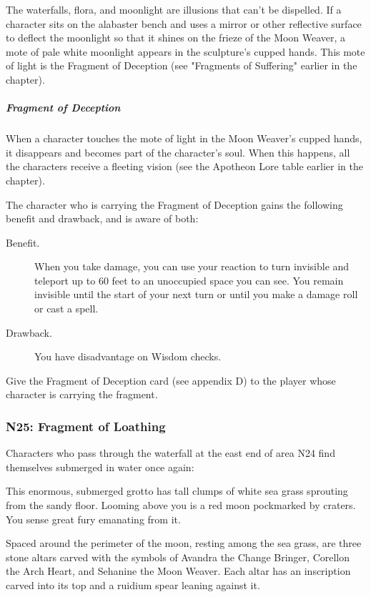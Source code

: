 \documentclass[10pt,a4paper,twoside,fancy,bg=print,twocolumn,openany,nodeprecatedcode]{dndbook}
\begin{document}
The waterfalls, flora, and moonlight are illusions that can't be dispelled. If a character sits on the alabaster bench and uses a mirror or other reflective surface to deflect the moonlight so that it shines on the frieze of the Moon Weaver, a mote of pale white moonlight appears in the sculpture's cupped hands. This mote of light is the Fragment of Deception (see "Fragments of Suffering" earlier in the chapter).

\subparagraph{Fragment of Deception}
When a character touches the mote of light in the Moon Weaver's cupped hands, it disappears and becomes part of the character's soul. When this happens, all the characters receive a fleeting vision (see the Apotheon Lore table earlier in the chapter).

The character who is carrying the Fragment of Deception gains the following benefit and drawback, and is aware of both:



\begin{description}
\item[Benefit.]
When you take damage, you can use your reaction to turn invisible and teleport up to 60 feet to an unoccupied space you can see. You remain invisible until the start of your next turn or until you make a damage roll or cast a spell.
\item[Drawback.]
You have disadvantage on Wisdom checks.
\end{description}





Give the Fragment of Deception card (see appendix D) to the player whose character is carrying the fragment.

\subsubsection{N25: Fragment of Loathing}
Characters who pass through the waterfall at the east end of area N24 find themselves submerged in water once again:

\begin{DndReadAloud}{}
This enormous, submerged grotto has tall clumps of white sea grass sprouting from the sandy floor. Looming above you is a red moon pockmarked by craters. You sense great fury emanating from it.

Spaced around the perimeter of the moon, resting among the sea grass, are three stone altars carved with the symbols of Avandra the Change Bringer, Corellon the Arch Heart, and Sehanine the Moon Weaver. Each altar has an inscription carved into its top and a ruidium spear leaning against it.

\end{DndReadAloud}
\end{document}
